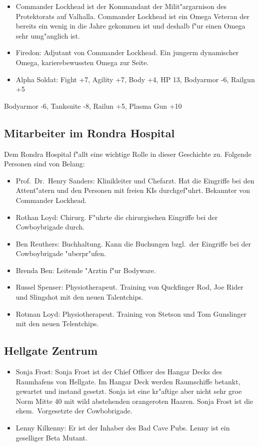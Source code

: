 \begin{itemize}
    \item Commander Lockhead ist der Kommandant der Milit"argarnison des Protektorats auf Valhalla. Commander Lockhead ist ein Omega Veteran der bereits ein wenig in die Jahre gekommen ist und deshalb f"ur einen Omega sehr umg"anglich ist. 
    \item Firedon: Adjutant von Commander Lockhead. Ein jungerm dynamischer Omega, karierebewussten Omega zur Seite.
    \item Alpha Soldat: Fight +7, Agility +7, Body +4, HP 13, Bodyarmor -6, Railgun +5
\end{itemize}

Bodyarmor -6, Tanksuite -8, Railun +5, Plasma Gun +10

\subsection{Mitarbeiter im Rondra Hospital}

Dem Rondra Hospital f"allt eine wichtige Rolle in dieser Geschichte zu. Folgende Personen sind von Belang:

\begin{itemize}
    \item Prof.~Dr.~Henry Sanders: Klinikleiter und Chefarzt. Hat die Eingriffe bei den Attent"atern und den Personen mit freien KIs durchgef"uhrt. Bekannter von Commander Lockhead.
    \item Rothan Loyd: Chirurg. F"uhrte die chirurgischen Eingriffe bei der Cowboybrigade durch.
    \item Ben Reuthers: Buchhaltung. Kann die Buchungen bzgl.~der Eingriffe bei der Cowboybrigade "uberpr"ufen.
    \item Brenda Ben: Leitende "Arztin f"ur Bodyware.
    \item Russel Spenser: Physiotherapeut. Training von Quckfinger Rod, Joe Rider und Slingshot mit den neuen Talentchips.
    \item Rotman Loyd: Physiotherapeut. Training von Stetson und Tom Gunslinger mit den neuen Telentchips.    
\end{itemize}

\subsection{Hellgate Zentrum}

\begin{itemize}
    \item Sonja Frost: Sonja Frost ist der Chief Officer des Hangar Decks des Raumhafens von Hellgate. Im Hangar Deck werden Raumschiffe betankt, gewartet und instand gesetzt. Sonja ist eine kr"aftige aber nicht sehr gro\3e Norm Mitte 40 mit wild abstehenden orangeroten Haaren. Sonja Frost ist die ehem.~Vorgesetzte der Cowbobrigade.
    \item Lenny Kilkenny: Er ist der Inhaber des Bad Cave Pubs. Lenny ist ein geselliger Beta Mutant.
\end{itemize}

